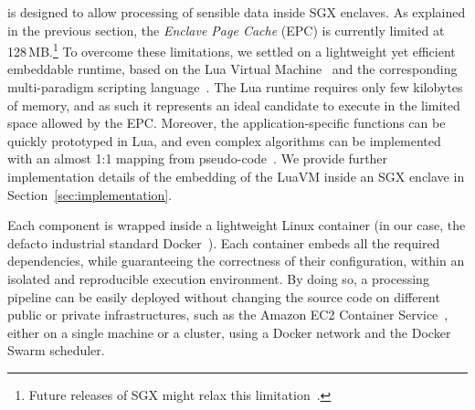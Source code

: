 \SYS is designed to allow processing of sensible data inside SGX enclaves.
As explained in the previous section, the \emph{Enclave Page Cache} (EPC) is currently limited at 128\,MB.\footnote{Future releases of SGX might relax this limitation~\cite{mckeen2016intel}.}
To overcome these limitations, we settled on a lightweight yet efficient embeddable runtime, based on the Lua Virtual Machine~\cite{ierusalimschy_luaextensible_1996} and the corresponding multi-paradigm scripting language~\cite{lualang}.
The Lua runtime requires only few kilobytes of memory, and as such it represents an ideal candidate to execute in the limited space allowed by the EPC.
Moreover, the application-specific functions can be quickly prototyped in Lua, and even complex algorithms can be implemented with an almost 1:1 mapping from pseudo-code~\cite{leonini2009splay}.
We provide further implementation details of the embedding of the LuaVM inside an SGX enclave in Section~\ref{sec:implementation}.


Each component is wrapped inside a lightweight Linux container (in our case, the defacto industrial standard Docker~\cite{docker}).
Each container embeds all the required dependencies, while guaranteeing the correctness of their configuration, within an isolated and reproducible execution environment.
By doing so, a \SYS processing pipeline can be easily deployed without changing the source code on different public or private infrastructures, such as the Amazon EC2 Container Service~\cite{awsec2container}, either on a single machine or a cluster, using a Docker network and the Docker Swarm\cite{docker:swarm_2016} scheduler.

